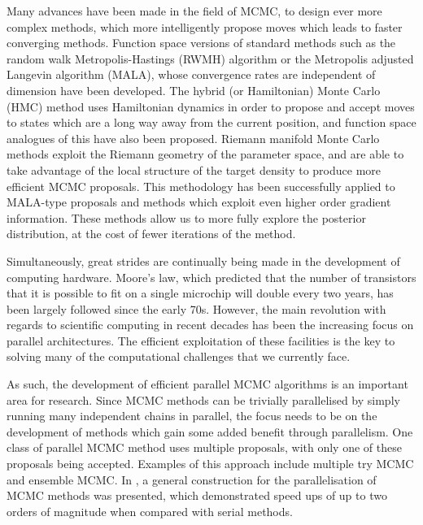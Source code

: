\documentclass[final]{siamltex}
\begin{document}
Many advances have been made in the field of MCMC, to design ever more
complex methods, which more intelligently propose moves which leads to
faster converging methods. Function space versions of standard methods
such as the random walk Metropolis-Hastings (RWMH) algorithm or the
Metropolis adjusted Langevin algorithm (MALA), whose convergence rates
are independent of dimension have been
developed\cite{cotter2013mcmc}. The hybrid (or Hamiltonian) Monte
Carlo (HMC) method uses Hamiltonian dynamics in order to propose and
accept moves to states which are a long way away from the current
position\cite{sexton1992hamiltonian}, and function space analogues of
this have also been proposed\cite{beskos2011hybrid}. Riemann
manifold Monte Carlo methods exploit the Riemann geometry of the
parameter space, and are able to take advantage of the local structure
of the target density to produce more efficient MCMC
proposals\cite{girolami2011riemann}. This methodology has been
successfully applied to MALA-type proposals and methods which exploit
even higher order gradient information\cite{bui2014solving}.  These
methods allow us to more fully explore the posterior distribution, at
the cost of fewer iterations of the method.

Simultaneously, great strides are continually being made in the
development of computing hardware. Moore's law, which predicted that
the number of transistors that it is possible to fit on a single
microchip will double every two years, has been largely followed
since the early 70s\cite{moore1998cramming}. However, the main revolution with regards to
scientific computing in recent decades has been the increasing focus on parallel
architectures. The efficient exploitation of these facilities is the key to
solving many of the computational challenges that we currently face.

As such, the development of efficient parallel MCMC algorithms is an
important area for research. Since MCMC methods can be trivially
parallelised by simply running many independent chains in parallel,
the focus needs to be on the development of methods which gain some
added benefit through parallelism. One class of parallel MCMC method
uses multiple proposals, with only one of these proposals being
accepted. Examples of this approach include multiple try
MCMC\cite{liu2000multiple} and ensemble MCMC\cite{neal2011mcmc}. In
\cite{calderhead2014general}, a general construction for the
parallelisation of MCMC methods was presented, which demonstrated
speed ups of up to two orders of magnitude when compared with serial methods.
\end{document}
